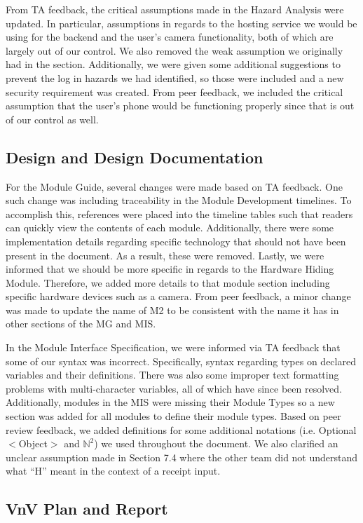 \documentclass{article}
\begin{document}
From TA feedback, the critical assumptions made in the Hazard Analysis were updated. In particular,
assumptions in regards to the hosting service we would be using for the backend and the user's
camera functionality, both of which are largely out of our control. We also removed the weak assumption
we originally had in the section. Additionally, we were given some additional suggestions to prevent
the log in hazards we had identified, so those were included and a new security requirement was created.
From peer feedback, we included the critical assumption that the user's phone would be functioning
properly since that is out of our control as well.

\subsection{Design and Design Documentation}

For the Module Guide, several changes were made based on TA feedback. One such change was
including traceability in the Module Development timelines. To accomplish this, references
were placed into the timeline tables such that readers can quickly view the contents of each
module. Additionally, there were some implementation details regarding specific technology that
should not have been present in the document. As a result, these were removed. Lastly, we were
informed that we should be more specific in regards to the Hardware Hiding Module. Therefore,
we added more details to that module section including specific hardware devices such as a camera.
From peer feedback, a minor change was made to update the name of M2 to be consistent with the
name it has in other sections of the MG and MIS.

In the Module Interface Specification, we were informed via TA feedback that some of our syntax
was incorrect. Specifically, syntax regarding types on declared variables and their definitions.
There was also some improper text formatting problems with multi-character variables, all of which
have since been resolved. Additionally, modules in the MIS were missing their Module Types so a new
section was added for all modules to define their module types. Based on peer review feedback, we
added definitions for some additional notations (i.e. Optional$<$Object$>$ and $\mathbb{N}^2$)
we used throughout the document. We also clarified an unclear assumption
made in Section 7.4 where the other team did not understand what ``H'' meant in the context
of a receipt input.

\subsection{VnV Plan and Report}
\end{document}
